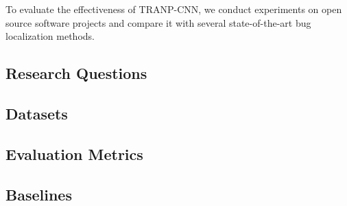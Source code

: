 To evaluate the effectiveness of TRANP-CNN, we conduct experiments on open source software projects and compare it with several state-of-the-art bug localization methods.

\subsection{Research Questions}


\subsection{Datasets}


\subsection{Evaluation Metrics}


\subsection{Baselines}

